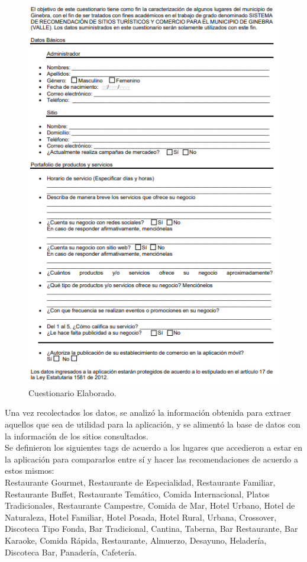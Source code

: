 \documentclass[12pt,letterpaper,openany]{book}
\begin{document}
\begin{figure}[H]
\begin{center}
\includegraphics[width=13cm]{./imagenes/cuest1}
\caption{Cuestionario Elaborado.}
\end{center}
\end{figure}

Una vez recolectados los datos, se analizó la información obtenida para extraer aquellos que sea de utilidad para la aplicación, y se alimentó la base de datos con la información de los sitios consultados.\\

Se definieron los siguientes tags de acuerdo a los lugares que accedieron a estar en la aplicación para compararlos entre sí y hacer las recomendaciones de acuerdo a estos mismos: \\
Restaurante Gourmet, Restaurante de Especialidad, Restaurante Familiar, Restaurante Buffet, Restaurante Temático, Comida Internacional, Platos Tradicionales, Restaurante Campestre, Comida de Mar, Hotel Urbano, Hotel de Naturaleza, Hotel Familiar, Hotel Posada, Hotel Rural,  Urbana, Crossover, Discoteca Tipo Fonda, Bar Tradicional, Cantina, Taberna, Bar Restaurante, Bar Karaoke, Comida Rápida, Restaurante, Almuerzo, Desayuno, Heladería, Discoteca Bar, Panadería, Cafetería.
\end{document}
